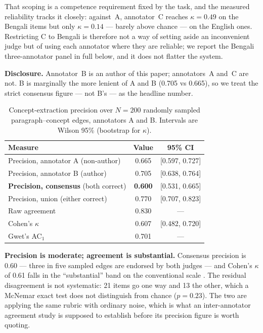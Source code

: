 \documentclass[11pt,a4paper]{article}
\begin{document}
That scoping is a competence requirement fixed by the task, and the
measured reliability tracks it closely: against~A, annotator~C reaches
$\kappa = 0.49$ on the Bengali items but only $\kappa = 0.14$ --- barely
above chance --- on the English ones. Restricting C to Bengali is
therefore not a way of setting aside an inconvenient judge but of using
each annotator where they are reliable; we report the Bengali
three-annotator panel in full below, and it does not flatter the system.

\textbf{Disclosure.} Annotator~B is an author of this paper; annotators~A
and~C are not. B is marginally the more lenient of A and B (0.705 vs
0.665), so we treat the strict consensus figure --- not B's --- as the
headline number.

\begin{table}[t]
\centering
\caption{Concept-extraction precision over $N=200$ randomly sampled
paragraph--concept edges, annotators A and B. Intervals are Wilson 95\%
(bootstrap for $\kappa$).}
\label{tab:precision}
\begin{tabular}{lcc}
\toprule
Measure & Value & 95\% CI\\
\midrule
Precision, annotator A (non-author)   & 0.665 & [0.597, 0.727]\\
Precision, annotator B (author)       & 0.705 & [0.638, 0.764]\\
\textbf{Precision, consensus} (both correct) & \textbf{0.600} & [0.531, 0.665]\\
Precision, union (either correct)     & 0.770 & [0.707, 0.823]\\
\midrule
Raw agreement                         & 0.830 & ---\\
Cohen's $\kappa$ \cite{cohen1960kappa} & 0.607 & [0.482, 0.720]\\
Gwet's AC$_1$ \cite{gwet2008ac1}       & 0.701 & ---\\
\bottomrule
\end{tabular}
\end{table}

\textbf{Precision is moderate; agreement is substantial.} Consensus
precision is 0.60 --- three in five sampled edges are endorsed by both
judges --- and Cohen's $\kappa$ of 0.61 falls in the ``substantial'' band
on the conventional scale \cite{landis1977kappa}. The residual
disagreement is not systematic: 21 items go one way and 13 the other,
which a McNemar exact test does not distinguish from chance
($p = 0.23$). The two are applying the same rubric with ordinary noise,
which is what an inter-annotator agreement study is supposed to establish
before its precision figure is worth quoting.
\end{document}
